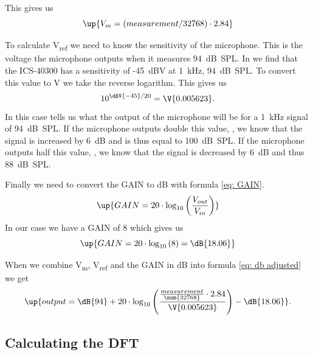     This gives us 
    \begin{equation}
      \label{eq: Vm worked out}
      \up{V_m = (measurement / 32768) \cdot 2.84}
    \end{equation}

    To calculate V\textsubscript{ref} we need to know the sensitivity of the microphone. This is the voltage the microphone outputs when it measures 94~dB~SPL. In  \cite{ICS40300} we find that the ICS-40300 has a sensitivity of -45~dBV at 1~kHz, 94~dB~SPL. To convert this value to V we take the reverse logarithm. This gives us
    \begin{equation}
      10^{\dBV{-45}/20} = \V{0.005623}.
    \end{equation}
    In this case  tells us what the output of the microphone will be for a 1~kHz signal of 94~dB~SPL. If the microphone outputs double this value, , we know that the signal is increased by 6~dB and is thus equal to 100~dB~SPL. If the microphone outputs half this value, , we know that the signal is decreased by 6~dB and thus 88~dB~SPL.

    Finally we need to convert the GAIN to dB with formula \ref{eq: GAIN}.
    \begin{equation}
      \label{eq: GAIN}
      \up{GAIN = 20 \cdot \log_{10} \left( \frac{V_{out}}{V_{in}} \right)}
    \end{equation}
    In our case we have a GAIN of 8 which gives us
    \begin{equation}
      \label{eq: GAIN worked out}
      \up{GAIN = 20 \cdot \log_{10} \left( 8 \right) = \dB{18.06}}
    \end{equation}

    When we combine V\textsubscript{m}, V\textsubscript{ref} and the GAIN in dB into formula \ref{eq: db adjusted} we get
    \begin{equation}
      \label{eq: db worked out}
      \up{output =  \dB{94} + 20 \cdot \log_{10} \left( \frac{\frac{measurement}{\num{32768}}\cdot 2.84}{\V{0.005623}} \right) - \dB{18.06}}.
    \end{equation}

    



  \subsection{Calculating the DFT}\label{ss: Calculating the DFT}


